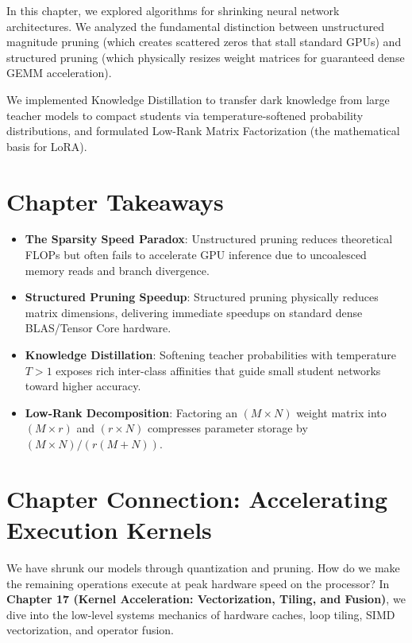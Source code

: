 \documentclass[
  letterpaper,
]{scrbook}
\providecommand{\tightlist}{%
  \setlength{\itemsep}{0pt}\setlength{\parskip}{0pt}}
\begin{document}
In this chapter, we explored algorithms for shrinking neural network
architectures. We analyzed the fundamental distinction between
unstructured magnitude pruning (which creates scattered zeros that stall
standard GPUs) and structured pruning (which physically resizes weight
matrices for guaranteed dense GEMM acceleration).

We implemented Knowledge Distillation to transfer dark knowledge from
large teacher models to compact students via temperature-softened
probability distributions, and formulated Low-Rank Matrix Factorization
(the mathematical basis for LoRA).

\section{Chapter Takeaways}\label{chapter-takeaways-16}

\begin{itemize}
\tightlist
\item
  \textbf{The Sparsity Speed Paradox}: Unstructured pruning reduces
  theoretical FLOPs but often fails to accelerate GPU inference due to
  uncoalesced memory reads and branch divergence.
\item
  \textbf{Structured Pruning Speedup}: Structured pruning physically
  reduces matrix dimensions, delivering immediate speedups on standard
  dense BLAS/Tensor Core hardware.
\item
  \textbf{Knowledge Distillation}: Softening teacher probabilities with
  temperature \(T > 1\) exposes rich inter-class affinities that guide
  small student networks toward higher accuracy.
\item
  \textbf{Low-Rank Decomposition}: Factoring an \((M \times N)\) weight
  matrix into \((M \times r)\) and \((r \times N)\) compresses parameter
  storage by \((M \times N) / (r(M + N))\).
\end{itemize}

\section{Chapter Connection: Accelerating Execution
Kernels}\label{chapter-connection-accelerating-execution-kernels}

We have shrunk our models through quantization and pruning. How do we
make the remaining operations execute at peak hardware speed on the
processor? In \textbf{Chapter 17 (Kernel Acceleration: Vectorization,
Tiling, and Fusion)}, we dive into the low-level systems mechanics of
hardware caches, loop tiling, SIMD vectorization, and operator fusion.
\end{document}
